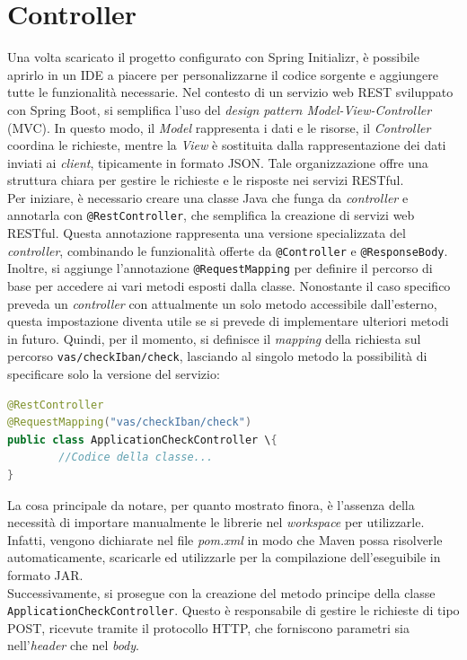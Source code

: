 \section{Controller}
Una volta scaricato il progetto configurato con Spring Initializr, è possibile aprirlo in un IDE a piacere per personalizzarne il codice sorgente e aggiungere tutte le funzionalità necessarie. Nel contesto di un servizio web REST sviluppato con Spring Boot, si semplifica l'uso del \textit{design pattern Model-View-Controller} (MVC). In questo modo, il \textit{Model} rappresenta i dati e le risorse, il \textit{Controller} coordina le richieste, mentre la \textit{View} è sostituita dalla rappresentazione dei dati inviati ai \textit{client}, tipicamente in formato JSON. Tale organizzazione offre una struttura chiara per gestire le richieste e le risposte nei servizi RESTful.\\
Per iniziare, è necessario creare una classe Java che funga da \textit{controller} e annotarla con \texttt{@RestController}, che semplifica la creazione di servizi web RESTful. Questa annotazione rappresenta una versione specializzata del \textit{controller}, combinando le funzionalità offerte da \texttt{@Controller} e \texttt{@ResponseBody}.\\
Inoltre, si aggiunge l’annotazione \texttt{@RequestMapping} per definire il percorso di base per accedere ai vari metodi esposti dalla classe. Nonostante il caso specifico preveda un \textit{controller} con attualmente un solo metodo accessibile dall'esterno, questa impostazione diventa utile se si prevede di implementare ulteriori metodi in futuro. Quindi, per il momento, si definisce il \textit{mapping} della richiesta sul percorso \texttt{vas/checkIban/check}, lasciando al singolo metodo la possibilità di specificare solo la versione del servizio:
\begin{lstlisting}[language=Java, caption=Implementazione della classe controller.]
@RestController
@RequestMapping("vas/checkIban/check")
public class ApplicationCheckController \{
		//Codice della classe...
}
\end{lstlisting}
La cosa principale da notare, per quanto mostrato finora, è l’assenza della necessità di importare manualmente le librerie nel \textit{workspace} per utilizzarle. Infatti, vengono dichiarate nel file \textit{pom.xml} in modo che Maven possa risolverle automaticamente, scaricarle ed utilizzarle per la compilazione dell’eseguibile in formato JAR.\\
Successivamente, si prosegue con la creazione del metodo principe della classe\\
\texttt{ApplicationCheckController}. Questo è responsabile di gestire le richieste di tipo POST, ricevute tramite il protocollo HTTP, che forniscono parametri sia nell’\textit{header} che nel \textit{body}.

